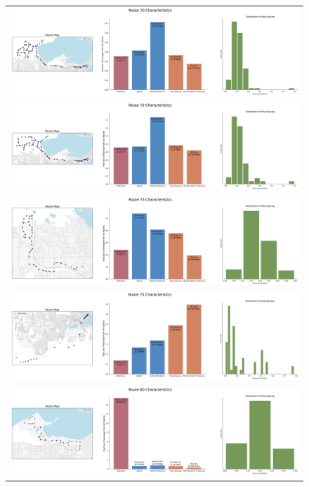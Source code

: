 \documentclass[letter]{article}
\begin{document}
\begin{figure}
\begin{center}
\begin{tabular}{ c }

  \includegraphics[width=150mm]{Route_70.png} \\ 
  \includegraphics[width=150mm]{Route_72.png}  \\
  \includegraphics[width=150mm]{Route_73.png}  \\
  \includegraphics[width=150mm]{Route_75.png}  \\
  \includegraphics[width=150mm]{Route_80.png} \\ 
  
  \end{tabular}
\end{center}
\end{figure}
\end{document}

